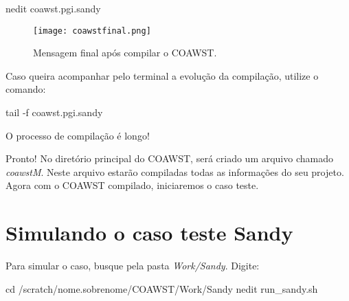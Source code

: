 \begin{bashcode}
nedit coawst.pgi.sandy
\end{bashcode}
\bigskip

\begin{figure}[H]
    \centering
    \texttt{[image: coawstfinal.png]}
    \caption{Mensagem final após compilar o COAWST.}
    \label{compcoafinal}
\end{figure}
\bigskip

\noindent Caso queira acompanhar pelo terminal a evolução da compilação, utilize o comando:
\bigskip

\begin{bashcode}
tail -f coawst.pgi.sandy
\end{bashcode}
\bigskip

\begin{tcolorbox}[enhanced,
  grow to left by=0cm,%
  grow to right by=0cm,%
  enlarge top by=0cm,%
  enlarge bottom by=0cm,%
  tcbox raise base,
  boxrule=1.0pt,
  left=18mm,
  colframe=red!50!black,coltext=red!25!black,colback=red!10!white,
  overlay={\begin{tcbclipinterior}\fill[red!75!blue!50!white] (frame.south west)
    rectangle node[text=white,font=\sffamily\bfseries\footnotesize,rotate=0] {ATENÇÃO} ([xshift=18mm]frame.north west);\end{tcbclipinterior}}]
O processo de compilação é longo!
\end{tcolorbox}
\bigskip


\noindent Pronto! No diretório principal do COAWST, será criado um arquivo chamado \textit{coawstM}. Neste arquivo estarão compiladas todas as informações do seu projeto. Agora com o COAWST compilado, iniciaremos o caso teste.
\bigskip

\section{Simulando o caso teste Sandy}\label{sandyexec}
\bigskip

\noindent Para simular o caso, busque pela pasta \textit{Work/Sandy}. Digite:
\bigskip


\begin{bashcode}
cd /scratch/nome.sobrenome/COAWST/Work/Sandy
nedit run_sandy.sh
\end{bashcode}
\bigskip

